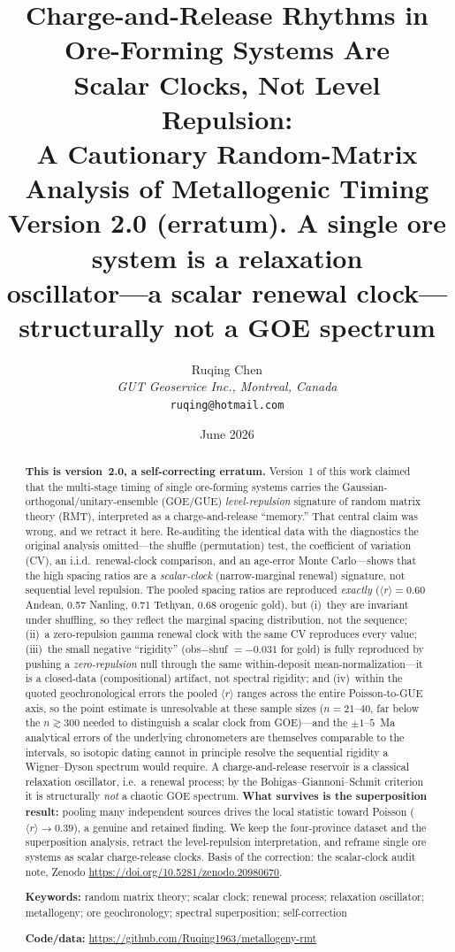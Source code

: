 \documentclass[12pt,a4paper]{article}
\title{\textbf{Charge-and-Release Rhythms in Ore-Forming Systems Are\\
Scalar Clocks, Not Level Repulsion:\\
A Cautionary Random-Matrix Analysis of Metallogenic Timing}\\[4pt]
\large Version 2.0 (erratum). A single ore system is a relaxation\\
oscillator---a scalar renewal clock---structurally not a GOE spectrum}
\author{Ruqing Chen\\
\textit{GUT Geoservice Inc., Montreal, Canada}\\
\texttt{ruqing@hotmail.com}}
\date{June 2026}
\newcommand{\rbar}{\langle r\rangle}
\begin{document}
\maketitle

\begin{abstract}
\noindent\textbf{This is version~2.0, a self-correcting erratum.} Version~1 of
this work claimed that the multi-stage timing of single ore-forming systems
carries the Gaussian-orthogonal/unitary-ensemble (GOE/GUE) \emph{level-repulsion}
signature of random matrix theory (RMT), interpreted as a charge-and-release
``memory.'' That central claim was wrong, and we retract it here. Re-auditing the
identical data with the diagnostics the original analysis omitted---the shuffle
(permutation) test, the coefficient of variation (CV), an i.i.d.\ renewal-clock
comparison, and an age-error Monte Carlo---shows that the high spacing ratios are
a \emph{scalar-clock} (narrow-marginal renewal) signature, not sequential level
repulsion. The pooled spacing ratios are reproduced \emph{exactly}
($\rbar=0.60$ Andean, 0.57 Nanling, 0.71 Tethyan, 0.68 orogenic gold), but (i)~they
are invariant under shuffling, so they reflect the marginal spacing distribution,
not the sequence; (ii)~a zero-repulsion gamma renewal clock with the same CV
reproduces every value; (iii)~the small negative ``rigidity'' (obs$-$shuf
$=-0.031$ for gold) is fully reproduced by pushing a \emph{zero-repulsion} null
through the same within-deposit mean-normalization---it is a closed-data
(compositional) artifact, not spectral rigidity; and (iv)~within the quoted
geochronological errors the pooled $\rbar$ ranges across the entire
Poisson-to-GUE axis, so the point estimate is unresolvable at these sample sizes
($n=21$--$40$, far below the $n\gtrsim300$ needed to distinguish a scalar clock
from GOE)---and the $\pm1$--$5$~Ma analytical errors of the underlying chronometers
are themselves comparable to the intervals, so isotopic dating cannot in principle
resolve the sequential rigidity a Wigner--Dyson spectrum would require. A charge-and-release reservoir is a classical relaxation oscillator,
i.e.\ a renewal process; by the Bohigas--Giannoni--Schmit criterion it is
structurally \emph{not} a chaotic GOE spectrum. \textbf{What survives is the
superposition result:} pooling many independent sources drives the local
statistic toward Poisson ($\rbar\to0.39$), a genuine and retained finding. We
keep the four-province dataset and the superposition analysis, retract the
level-repulsion interpretation, and reframe single ore systems as scalar
charge-release clocks. Basis of the correction: the scalar-clock audit note,
Zenodo \url{https://doi.org/10.5281/zenodo.20980670}.

\medskip
\noindent\textbf{Keywords:} random matrix theory; scalar clock; renewal process;
relaxation oscillator; metallogeny; ore geochronology; spectral superposition;
self-correction

\medskip
\noindent\textbf{Code/data:} \url{https://github.com/Ruqing1963/metallogeny-rmt}
\end{abstract}
\end{document}
